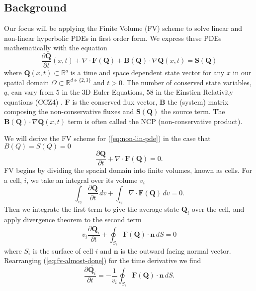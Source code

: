 \subsection{Background}
Our focus will be applying the Finite Volume (FV) scheme to solve linear and non-linear hyperbolic PDEs in first order form.
We express these PDEs mathematically with the equation
\begin{equation}\label{eq:non-lin-pde}
    \frac{\partial \mathbf{Q}}{\partial t}(x,t) + \nabla \cdot \mathbf{F}(\mathbf{Q}) + \mathbf{B}(\mathbf{Q}) \cdot \nabla \mathbf{Q}(x,t) = \mathbf{S}(\mathbf{Q})
\end{equation}
where $\mathbf{Q}(x,t)\subset \mathbb{R}^q$ is a time and space dependent state vector for any $x$ in our spatial domain $\Omega\subset \mathbb{R}^{d \in \{2,3\}}$ and $t>0$.
The number of conserved state variables, $q$, can vary from $5$ in the 3D Euler Equations, $58$ in the Einstien Relativity equations (CCZ4) \cite{CCZ4}.
$\mathbf{F}$ is the conserved flux vector, $\mathbf{B}$ the (system) matrix composing the non-conservative fluxes and $\mathbf{S}(\mathbf{Q})$ the source term.
The $\mathbf{B}(\mathbf{Q}) \cdot \nabla \mathbf{Q}(x,t)$ term is often called the NCP (non-conservative product).


We will derive the FV scheme for  (\ref{eq:non-lin-pde}) in the case that $B(Q)=S(Q)=0$
\begin{equation*}
    \frac{\partial \mathbf{Q}}{\partial t} + \nabla\cdot \mathbf{F}(\mathbf{Q}) = 0.
\end{equation*}
FV begins by dividing the spacial domain into finite volumes, known as cells.
For a cell, $i$, we take an integral over its volume $v_i$
\begin{equation*}
    \int_{v_i}\frac{\partial \mathbf{Q}}{\partial t}\,dv + \int_{v_i}\nabla\cdot \mathbf{F}(\mathbf{Q})\,dv = 0.
\end{equation*}
Then we integrate the first term to give the average state $\bar{\mathbf{Q}_i}$ over the cell, and apply divergence theorem to the second term
\begin{equation}\label{eq:fv-almost-done}
    v_i\frac{\partial \bar{\mathbf{Q}_i}}{\partial t} + \oint_{S_i}\mathbf{F}(\mathbf{Q})\cdot \mathbf{n} \, dS = 0
\end{equation}
where $S_i$ is the surface of cell $i$ and $\mathbf{n}$ is the outward facing normal vector.
Rearranging (\ref{eq:fv-almost-done}) for the time derivative we find
\begin{equation}\label{eq:fv-done}
   \frac{\partial \bar{\mathbf{Q}_i}}{\partial t} = -\frac{1}{v_i} \oint_{S_i}\mathbf{F}(\mathbf{Q})\cdot \mathbf{n} \, dS.
\end{equation}

